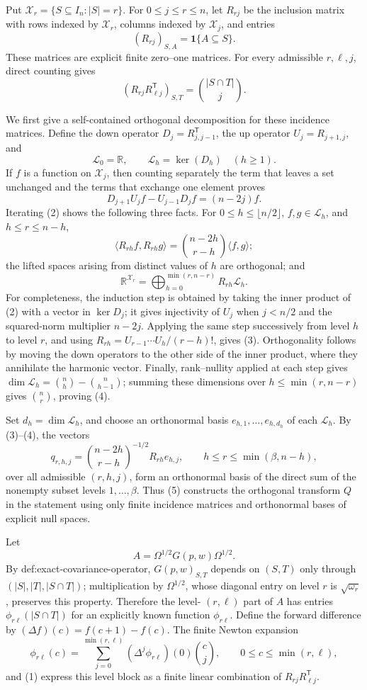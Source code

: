 Put \(\mathcal X_r=\{S\subseteq I_n:|S|=r\}\).  For \(0\le j\le r\le n\), let \(R_{rj}\) be the inclusion matrix with rows indexed by \(\mathcal X_r\), columns indexed by \(\mathcal X_j\), and entries
\[
(R_{rj})_{S,A}=\mathbf 1\{A\subseteq S\}.
\]
These matrices are explicit finite zero--one matrices.  For every admissible \(r,\ell,j\), direct counting gives
\[
(R_{rj}R_{\ell j}^{\mathsf T})_{S,T}
=\binom{|S\cap T|}{j}.
\tag{1}
\]

We first give a self-contained orthogonal decomposition for these incidence matrices.  Define the down operator \(D_j=R_{j,j-1}^{\mathsf T}\), the up operator \(U_j=R_{j+1,j}\), and
\[
\mathcal L_0=\mathbb R,
\qquad
\mathcal L_h=\ker(D_h)\quad (h\ge1).
\]
If \(f\) is a function on \(\mathcal X_j\), then counting separately the term that leaves a set unchanged and the terms that exchange one element proves
\[
D_{j+1}U_jf-U_{j-1}D_jf=(n-2j)f.
\tag{2}
\]
Iterating (2) shows the following three facts.  For \(0\le h\le\lfloor n/2\rfloor\), \(f,g\in\mathcal L_h\), and \(h\le r\le n-h\),
\[
\langle R_{rh}f,R_{rh}g\rangle
=\binom{n-2h}{r-h}\langle f,g\rangle;
\tag{3}
\]
the lifted spaces arising from distinct values of \(h\) are orthogonal; and
\[
\mathbb R^{\mathcal X_r}
=\bigoplus_{h=0}^{\min(r,n-r)}R_{rh}\mathcal L_h.
\tag{4}
\]
For completeness, the induction step is obtained by taking the inner product of (2) with a vector in \(\ker D_j\); it gives injectivity of \(U_j\) when \(j<n/2\) and the squared-norm multiplier \(n-2j\).  Applying the same step successively from level \(h\) to level \(r\), and using \(R_{rh}=U_{r-1}\cdots U_h/(r-h)!\), gives (3).  Orthogonality follows by moving the down operators to the other side of the inner product, where they annihilate the harmonic vector.  Finally, rank--nullity applied at each step gives
\(\dim\mathcal L_h=\binom nh-\binom n{h-1}\); summing these dimensions over \(h\le\min(r,n-r)\) gives \(\binom nr\), proving (4).

Set \(d_h=\dim\mathcal L_h\), and choose an orthonormal basis \(e_{h,1},\ldots,e_{h,d_h}\) of each \(\mathcal L_h\).  By (3)--(4), the vectors
\[
q_{r,h,j}
=\binom{n-2h}{r-h}^{-1/2}R_{rh}e_{h,j},
\qquad
h\le r\le \min(\beta,n-h),
\tag{5}
\]
over all admissible \((r,h,j)\), form an orthonormal basis of the direct sum of the nonempty subset levels \(1,\ldots,\beta\).  Thus (5) constructs the orthogonal transform \(Q\) in the statement using only finite incidence matrices and orthonormal bases of explicit null spaces.

Let
\[
A=\Omega^{1/2}G(p,w)\Omega^{1/2}.
\]
By def:exact-covariance-operator, \(G(p,w)_{S,T}\) depends on \((S,T)\) only through \((|S|,|T|,|S\cap T|)\); multiplication by \(\Omega^{1/2}\), whose diagonal entry on level \(r\) is \(\sqrt{\omega_r}\), preserves this property.  Therefore the level-
\((r,\ell)\) part of \(A\) has entries \(\phi_{r\ell}(|S\cap T|)\) for an explicitly known function \(\phi_{r\ell}\).  Define the forward difference by \((\Delta f)(c)=f(c+1)-f(c)\).  The finite Newton expansion
\[
\phi_{r\ell}(c)
=\sum_{j=0}^{\min(r,\ell)}(\Delta^j\phi_{r\ell})(0)\binom cj,
\qquad 0\le c\le\min(r,\ell),
\tag{6}
\]
and (1) express this level block as a finite linear combination of \(R_{rj}R_{\ell j}^{\mathsf T}\).

